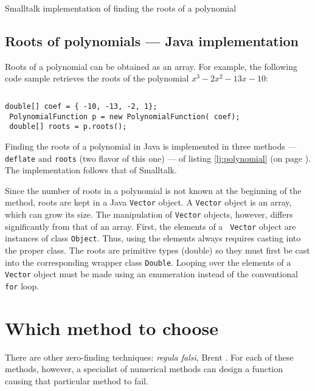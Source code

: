 \documentclass[twoside]{book}
\begin{document}
\begin{listing} Smalltalk implementation of finding the roots of a polynomial \label{ls:polroots}

\end{listing}


\subsection{Roots of polynomials --- Java implementation}
\label{sec:polrootsjava} Roots of a polynomial can be obtained as
an array. For example, the following code sample retrieves the
roots of the polynomial $x^3-2x^2-13x-10$:
\begin{codeExample}
\begin{verbatim}

\end{verbatim}
{\tt double[] coef = \{ -10, -13, -2, 1\};}\\ {\tt
PolynomialFunction p = new PolynomialFunction( coef);}\\ {\tt
double[] roots = p.roots();}\\
\end{codeExample}
Finding the roots of a polynomial in Java is implemented in three
methods --- {\tt deflate} and {\tt roots} (two flavor of this one)
--- of listing \ref{lj:polynomial} (on page \pageref{lj:polynomial}).
The implementation follows that of Smalltalk.

Since the number of roots in a polynomial is not known at the
beginning of the method, roots are kept in a Java {\tt Vector}
object. A {\tt Vector} object is an array, which can grow its
size. The manipulation of {\tt Vector} objects, however, differs
significantly from that of an array. First, the elements of a {\tt
Vector} object are instances of class {\tt Object}. Thus, using
the elements always requires casting into the proper class. The
roots are primitive types (double) so they must first be cast into
the corresponding wrapper class {\tt Double}. Looping over the
elements of a {\tt Vector} object must be made using an
enumeration instead of the conventional {\tt for} loop.

\section{Which method to choose}
There are other zero-finding techniques: {\it regula falsi}, Brent
\cite{Press}. For each of these methods, however, a specialist of
numerical methods can design a function causing that particular
method to fail.
\end{document}
